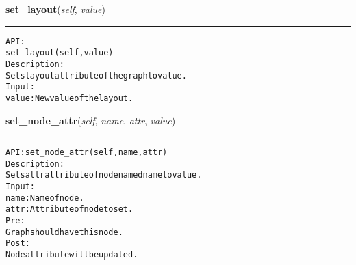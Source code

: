     \label{coinor:gimpy:graph:Graph:set_layout}

    \vspace{0.5ex}

\hspace{.8\funcindent}\begin{boxedminipage}{\funcwidth}

    \raggedright \textbf{set\_layout}(\textit{self}, \textit{value})

    \vspace{-1.5ex}

    \rule{\textwidth}{0.5\fboxrule}
\setlength{\parskip}{2ex}
\begin{alltt}

API:
    set\_layout(self, value)
Description:
Sets layout attribute of the graph to value.
Input:
    value: New value of the layout.
\end{alltt}

\setlength{\parskip}{1ex}
    \end{boxedminipage}

    \label{coinor:gimpy:graph:Graph:set_node_attr}

    \vspace{0.5ex}

\hspace{.8\funcindent}\begin{boxedminipage}{\funcwidth}

    \raggedright \textbf{set\_node\_attr}(\textit{self}, \textit{name}, \textit{attr}, \textit{value})

    \vspace{-1.5ex}

    \rule{\textwidth}{0.5\fboxrule}
\setlength{\parskip}{2ex}
\begin{alltt}

API: set\_node\_attr(self, name, attr)
Description:
Sets attr attribute of node named name to value.
Input:
    name: Name of node.
    attr: Attribute of node to set.
Pre:
    Graph should have this node.
Post:
    Node attribute will be updated.
\end{alltt}

\setlength{\parskip}{1ex}
    \end{boxedminipage}

